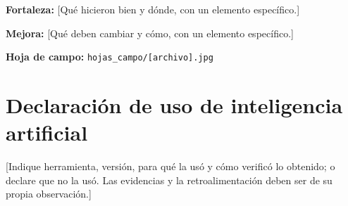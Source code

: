 \documentclass[11pt,a4paper]{article}
\begin{document}
\textbf{Fortaleza:} [Qué hicieron bien y dónde, con un elemento específico.]

\textbf{Mejora:} [Qué deben cambiar y cómo, con un elemento específico.]

\textbf{Hoja de campo:} \texttt{hojas\_campo/[archivo].jpg}

\clearpage

\section*{Declaración de uso de inteligencia artificial}

[Indique herramienta, versión, para qué la usó y cómo verificó lo obtenido; o declare que no la usó. Las evidencias y la retroalimentación deben ser de su propia observación.]
\end{document}
